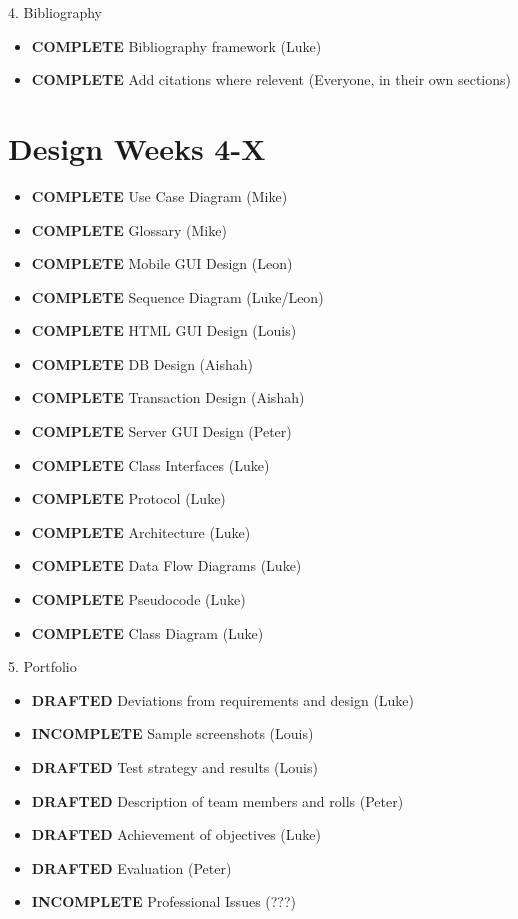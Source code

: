 4. Bibliography
\begin{itemize}
\item \textbf{COMPLETE} Bibliography framework (Luke)
\item \textbf{COMPLETE} Add citations where relevent (Everyone, in their own sections)
\end{itemize}

\section{Design \textbf{Weeks 4-X}}
\begin{itemize}
\item \textbf{COMPLETE}   Use Case Diagram (Mike)
\item \textbf{COMPLETE}   Glossary (Mike)
\item \textbf{COMPLETE}   Mobile GUI Design (Leon)
\item \textbf{COMPLETE}   Sequence Diagram (Luke/Leon)
\item \textbf{COMPLETE}   HTML GUI Design (Louis)
\item \textbf{COMPLETE}   DB Design (Aishah)
\item \textbf{COMPLETE}   Transaction Design (Aishah)
\item \textbf{COMPLETE}   Server GUI Design (Peter)
\item \textbf{COMPLETE}   Class Interfaces (Luke)
\item \textbf{COMPLETE}   Protocol (Luke)
\item \textbf{COMPLETE}   Architecture (Luke)
\item \textbf{COMPLETE}   Data Flow Diagrams (Luke)
\item \textbf{COMPLETE}   Pseudocode (Luke)
\item \textbf{COMPLETE}   Class Diagram (Luke)
\end{itemize}

5. Portfolio
\begin{itemize}
\item \textbf{DRAFTED}    Deviations from requirements and design (Luke)
\item \textbf{INCOMPLETE} Sample screenshots (Louis)
\item \textbf{DRAFTED}    Test strategy and results (Louis)
\item \textbf{DRAFTED}    Description of team members and rolls (Peter)
\item \textbf{DRAFTED}    Achievement of objectives (Luke)
\item \textbf{DRAFTED}    Evaluation (Peter)
\item \textbf{INCOMPLETE} Professional Issues (???)
\end{itemize}

